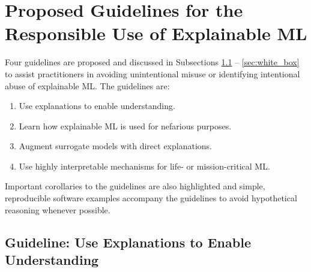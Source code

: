 \documentclass{article}
\begin{document}
\section{Proposed Guidelines for the Responsible Use of Explainable ML}

Four guidelines are proposed and discussed in Subsections \ref{sec:trust} -- \ref{sec:white_box} to assist practitioners in avoiding unintentional misuse or identifying intentional abuse of explainable ML. The guidelines are:

\begin{enumerate}

\item Use explanations to enable understanding.
\item Learn how explainable ML is used for nefarious purposes.
\item Augment surrogate models with direct explanations.
\item Use highly interpretable mechanisms for life- or mission-critical ML.

\end{enumerate}

\noindent Important corollaries to the guidelines are also highlighted and simple, reproducible software examples accompany the guidelines to avoid hypothetical reasoning whenever possible.

\subsection{Guideline: Use Explanations to Enable Understanding} \label{sec:trust}
\end{document}
